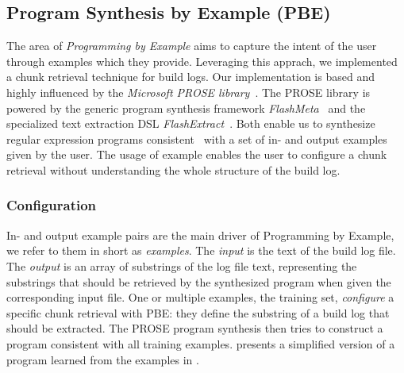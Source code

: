 \subsection{Program Synthesis by Example (PBE)}
\label{sec:expl-pbe}
The area of \emph{Programming by Example} aims to capture the
intent of the user through examples which they provide.
Leveraging this apprach, we implemented a chunk retrieval technique
for build logs.
Our implementation is based and highly influenced by the
\emph{Microsoft PROSE library}~\cite{prose2019webpage}.
The PROSE library is powered by the generic program synthesis framework
\emph{FlashMeta}~\cite{polozov2015flashmeta:} and the specialized
text extraction DSL \emph{FlashExtract}~\cite{le2014flashextract:}.
Both enable us to synthesize regular expression programs
consistent~\cite{mitchell1982generalization} with a set of in-
and output examples given by the user.
The usage of example enables the user to configure a chunk
retrieval without understanding the whole structure of
the build log.

\subsubsection{Configuration}
In- and output example pairs are the main driver of Programming by
Example, we refer to them in short as \emph{examples}.
The \emph{input} is the text of the build log file.
The \emph{output} is
an array of substrings of the log file text, representing the
substrings that should be retrieved by the synthesized program when
given the corresponding input file.
One or multiple examples, the
training set, \emph{configure} a specific chunk retrieval with PBE:
they define the substring of a build log that should be extracted.
The PROSE program synthesis then tries to construct a program
consistent with all training examples.
 presents a simplified version
of a program learned from the examples in .


